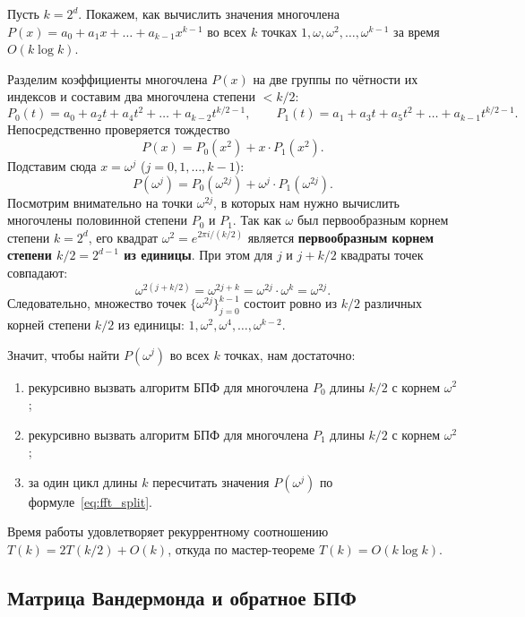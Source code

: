 Пусть $k = 2^d$. Покажем, как вычислить значения многочлена $P(x) = a_0 + a_1 x + \dots + a_{k-1} x^{k-1}$ во всех $k$ точках $1, \omega, \omega^2, \dots, \omega^{k-1}$ за время $O(k \log k)$.

Разделим коэффициенты многочлена $P(x)$ на две группы по чётности их индексов и составим два многочлена степени $< k / 2$:
\[
    P_0(t) = a_0 + a_2 t + a_4 t^2 + \dots + a_{k-2} t^{k/2 - 1}, \qquad
    P_1(t) = a_1 + a_3 t + a_5 t^2 + \dots + a_{k-1} t^{k/2 - 1}.
\]
Непосредственно проверяется тождество
\[
    P(x) = P_0(x^2) + x \cdot P_1(x^2).
\]
Подставим сюда $x = \omega^j$ ($j = 0, 1, \dots, k - 1$):
\begin{equation}\label{eq:fft_split}
    P(\omega^j) = P_0(\omega^{2j}) + \omega^j \cdot P_1(\omega^{2j}).
\end{equation}
Посмотрим внимательно на точки $\omega^{2j}$, в которых нам нужно вычислить многочлены половинной степени $P_0$ и $P_1$. Так как $\omega$ был первообразным корнем степени $k = 2^d$, его квадрат $\omega^2 = e^{2\pi i / (k/2)}$ является \textbf{первообразным корнем степени $k / 2 = 2^{d-1}$ из единицы}. При этом для $j$ и $j + k/2$ квадраты точек совпадают:
\[
    \omega^{2(j + k/2)} = \omega^{2j + k} = \omega^{2j} \cdot \omega^k = \omega^{2j}.
\]
Следовательно, множество точек $\{\omega^{2j}\}_{j=0}^{k-1}$ состоит ровно из $k / 2$ различных корней степени $k / 2$ из единицы: $1, \omega^2, \omega^4, \dots, \omega^{k-2}$.

Значит, чтобы найти $P(\omega^j)$ во всех $k$ точках, нам достаточно:
\begin{enumerate}
    \item рекурсивно вызвать алгоритм БПФ для многочлена $P_0$ длины $k/2$ с корнем $\omega^2$;
    \item рекурсивно вызвать алгоритм БПФ для многочлена $P_1$ длины $k/2$ с корнем $\omega^2$;
    \item за один цикл длины $k$ пересчитать значения $P(\omega^j)$ по формуле~\eqref{eq:fft_split}.
\end{enumerate}
Время работы удовлетворяет рекуррентному соотношению $T(k) = 2 T(k / 2) + O(k)$, откуда по мастер-теореме $T(k) = O(k \log k)$.

\subsection{Матрица Вандермонда и обратное БПФ}

